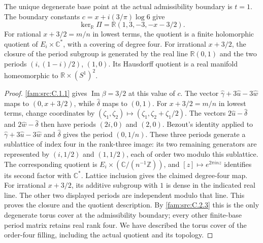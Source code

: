 \begin{proposition}\label{fam:src:C.3.2}\label{fam:st:C.3.2}
The unique degenerate base point at the actual admissibility boundary is
\(t=1\). The boundary constants
\(c=x+i(3/\pi)\log6\) give
\[
 \ker_{\mathbb R}\Pi=\mathbb R(1,3,-3,-x-3/2).
\]
For rational $x+3/2=m/n$ in lowest terms, the quotient is a
finite holomorphic quotient of $E_i\times\mathbb C^*$, with a covering
of degree four. For irrational \(x+3/2\), the closure of the period subgroup is generated
by the real line \(\mathbb R(0,1)\) and the two periods
\((i,(1-i)/2)\), \((1,0)\). Its Hausdorff quotient is a real manifold
homeomorphic to \(\mathbb R\times(S^1)^2\).
\end{proposition}

\begin{proof}
\ref{fam:src:C.1.1} gives \(\operatorname{Im}\beta=3/2\) at this value of \(c\).
The vector \(\widehat\gamma+3\widehat u-3\widehat w\) maps to
\((0,x+3/2)\), while \(\widehat\delta\) maps to \((0,1)\).
For $x+3/2=m/n$ in lowest terms, change coordinates by
$(\zeta_1,\zeta_2)\mapsto(\zeta_1,\zeta_2+\zeta_1/2)$.
The vectors $2\widehat u-\widehat\delta$ and
$2\widehat w-\widehat\delta$ then have periods $(2i,0)$ and $(2,0)$.
Bezout's identity applied to $\widehat\gamma+3\widehat u-3\widehat w$
and $\widehat\delta$ gives the period $(0,1/n)$.
These three periods generate a sublattice of index four in the rank-three
image: its two remaining generators are represented by
$(i,1/2)$ and $(1,1/2)$, each of order two modulo this sublattice.
The corresponding quotient is $E_i\times(\mathbb C/(n^{-1}\mathbb Z))$,
and $[z]\mapsto e^{2\pi inz}$ identifies its second factor with
$\mathbb C^*$. Lattice inclusion gives the claimed degree-four map.
For irrational $x+3/2$, its additive subgroup with $1$ is dense in the
indicated real line. The other two displayed periods are independent
modulo that line. This proves the closure and the quotient description.
By \ref{fam:src:C.2.3} this is the only degenerate torus cover at the admissibility
boundary; every other finite-base period matrix retains real rank four.
We have described the torus cover of the order-four filling, including
the actual quotient and its topology.
\end{proof}

